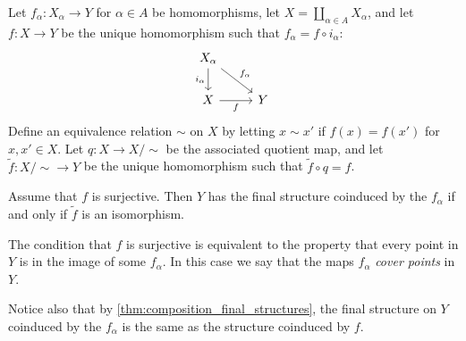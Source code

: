 \documentclass[article, a4paper, 11pt, oneside]{memoir}
\numberwithin{equation}{chapter}
\begin{document}
\begin{proposition}
    \label{thm:final_structures_quotient}
    Let $f_\alpha \colon X_\alpha \to Y$ for $\alpha \in A$ be homomorphisms, let $X = \coprod_{\alpha \in A} X_\alpha$, and let $f \colon X \to Y$ be the unique homomorphism such that $f_\alpha = f \circ i_\alpha$:
    \begin{equation*}
        \begin{tikzcd}
            X_\alpha
                \ar[d, "i_\alpha", swap]
                \ar[dr, "f_\alpha"] \\
            X
                \ar[r, "f", swap]
            & Y
        \end{tikzcd}
    \end{equation*}
    Define an equivalence relation $\sim$ on $X$ by letting $x \sim x'$ if $f(x) = f(x')$ for $x,x' \in X$. Let $q \colon X \to X/{\sim}$ be the associated quotient map, and let $\tilde{f} \colon X/{\sim} \to Y$ be the unique homomorphism such that $\tilde{f} \circ q = f$.

    Assume that $f$ is surjective. Then $Y$ has the final structure coinduced by the $f_\alpha$ if and only if $\tilde{f}$ is an isomorphism.
\end{proposition}
%
The condition that $f$ is surjective is equivalent to the property that every point in $Y$ is in the image of some $f_\alpha$. In this case we say that the maps $f_\alpha$ \emph{cover points} in $Y$.

Notice also that by \cref{thm:composition_final_structures}, the final structure on $Y$ coinduced by the $f_\alpha$ is the same as the structure coinduced by $f$.
\end{document}
